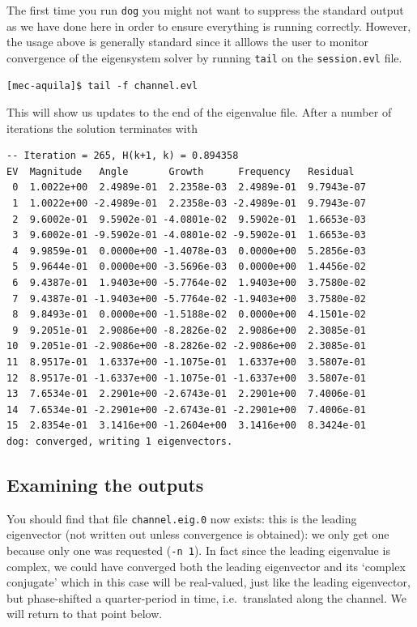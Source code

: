 \documentclass[11pt,a4paper]{report}
\newcommand{\ie}{i.e.\ }
\begin{document}
The first time you run \verb+dog+ you might not want to suppress the
standard output as we have done here in order to ensure everything is
running correctly. However, the usage above is generally standard
since it alllows the user to monitor convergence of the eigensystem
solver by running \verb+tail+ on the \verb+session.evl+ file.  {\small
\begin{verbatim}
[mec-aquila]$ tail -f channel.evl
\end{verbatim}
} This will show us updates to the end of the eigenvalue file.  After
a number of iterations the solution terminates with {\small
\begin{verbatim}
-- Iteration = 265, H(k+1, k) = 0.894358
EV  Magnitude   Angle       Growth      Frequency   Residual
 0  1.0022e+00  2.4989e-01  2.2358e-03  2.4989e-01  9.7943e-07
 1  1.0022e+00 -2.4989e-01  2.2358e-03 -2.4989e-01  9.7943e-07
 2  9.6002e-01  9.5902e-01 -4.0801e-02  9.5902e-01  1.6653e-03
 3  9.6002e-01 -9.5902e-01 -4.0801e-02 -9.5902e-01  1.6653e-03
 4  9.9859e-01  0.0000e+00 -1.4078e-03  0.0000e+00  5.2856e-03
 5  9.9644e-01  0.0000e+00 -3.5696e-03  0.0000e+00  1.4456e-02
 6  9.4387e-01  1.9403e+00 -5.7764e-02  1.9403e+00  3.7580e-02
 7  9.4387e-01 -1.9403e+00 -5.7764e-02 -1.9403e+00  3.7580e-02
 8  9.8493e-01  0.0000e+00 -1.5188e-02  0.0000e+00  4.1501e-02
 9  9.2051e-01  2.9086e+00 -8.2826e-02  2.9086e+00  2.3085e-01
10  9.2051e-01 -2.9086e+00 -8.2826e-02 -2.9086e+00  2.3085e-01
11  8.9517e-01  1.6337e+00 -1.1075e-01  1.6337e+00  3.5807e-01
12  8.9517e-01 -1.6337e+00 -1.1075e-01 -1.6337e+00  3.5807e-01
13  7.6534e-01  2.2901e+00 -2.6743e-01  2.2901e+00  7.4006e-01
14  7.6534e-01 -2.2901e+00 -2.6743e-01 -2.2901e+00  7.4006e-01
15  2.8354e-01  3.1416e+00 -1.2604e+00  3.1416e+00  8.3424e-01
dog: converged, writing 1 eigenvectors.
\end{verbatim}
} 

\subsection{Examining the outputs}

You should find that file \verb+channel.eig.0+ now exists: this is the
leading eigenvector (not written out unless convergence is obtained):
we only get one because only one was requested (\verb+-n 1+).  In fact
since the leading eigenvalue is complex, we could have converged both
the leading eigenvector and its `complex conjugate' which in this case
will be real-valued, just like the leading eigenvector, but
phase-shifted a quarter-period in time, \ie translated along the
channel. We will return to that point below.
\end{document}
